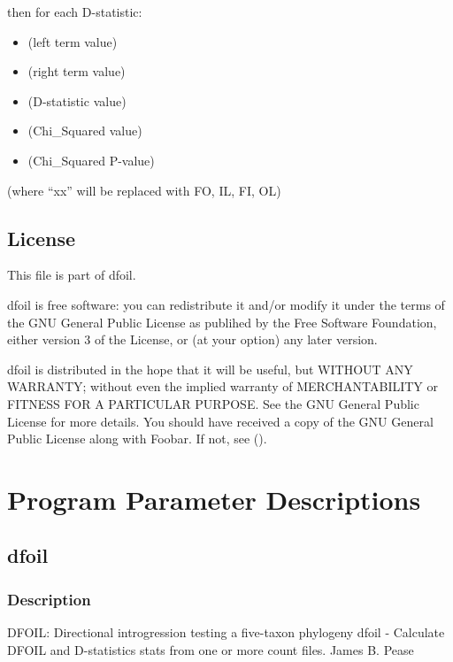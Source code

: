 \documentclass[letterpaper,12pt,english]{sphinxmanual}
\begin{document}
then for each D-statistic:
\begin{itemize}
\item {} 
 (left term value)

\item {} 
 (right term value)

\item {} 
 (D-statistic value)

\item {} 
 (Chi\_Squared value)

\item {} 
 (Chi\_Squared P-value)

\end{itemize}

(where “xx” will be replaced with FO, IL, FI, OL)


\section{License}
\label{\detokenize{intro:license}}
This file is part of dfoil.

dfoil is free software: you can redistribute it and/or modify it under the terms of the GNU General Public License as publihed by the Free Software Foundation, either version 3 of the License, or (at your option) any later version.

dfoil is distributed in the hope that it will be useful, but WITHOUT ANY WARRANTY; without even the implied warranty of MERCHANTABILITY or FITNESS FOR A PARTICULAR PURPOSE.  See the GNU General Public License for more details. You should have received a copy of the GNU General Public License along with Foobar.  If not, see ().


\chapter{Program Parameter Descriptions}
\label{\detokenize{prog_desc:program-parameter-descriptions}}\label{\detokenize{prog_desc::doc}}

\section{dfoil}
\label{\detokenize{prog_desc:dfoil}}

\subsection{Description}
\label{\detokenize{prog_desc:description}}
DFOIL: Directional introgression testing a five-taxon phylogeny
dfoil - Calculate DFOIL and D-statistics stats from one or more count files.
James B. Pease
\end{document}
